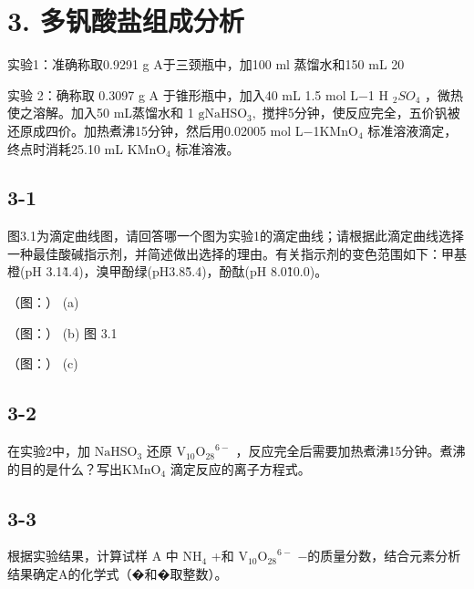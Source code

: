 \section*{3. 多钒酸盐组成分析}
实验1：准确称取0.9291 g A于三颈瓶中，加100 ml 蒸馏⽔和150 mL 20%

实验 2：确称取 0.3097 g A 于锥形瓶中，加⼊40 mL 1.5 mol L−1 H ${ } _ { 2 } S O _ { 4 }$ ，微热使之溶解。加⼊50 mL蒸馏⽔和 1 $\mathrm { g N a H S O _ { 3 } , }$ 搅拌5分钟，使反应完全，五价钒被还原成四价。加热煮沸15分钟，然后⽤0.02005 mol L−1$\mathrm { K M n O } _ { 4 }$ 标准溶液滴定，终点时消耗25.10 mL $\mathrm { K M n O } _ { 4 }$ 标准溶液。

\subsection*{3-1}
图3.1为滴定曲线图，请回答哪⼀个图为实验1的滴定曲线；请根据此滴定曲线选择⼀种最佳酸碱指⽰剂，并简述做出选择的理由。有关指⽰剂的变⾊范围如下：甲基橙(pH 3.1\~4.4)，溴甲酚绿(pH3.8\~5.4)，酚酞(pH 8.0\~10.0)。

（图：）
(a)

（图：）
(b)
图 3.1

（图：）
(c)

\subsection*{3-2}
在实验2中，加 $\mathrm { N a H S O _ { 3 } }$ 还原 $\mathrm { V _ { 1 0 } O _ { 2 8 } } ^ { 6 - }$ ，反应完全后需要加热煮沸15分钟。煮沸的⽬的是什么？写出$\mathrm { K M n O } _ { 4 }$ 滴定反应的离⼦⽅程式。

\subsection*{3-3}
根据实验结果，计算试样 A 中 $\mathrm { N H } _ { 4 }$ +和 $\mathrm { V _ { 1 0 } O _ { 2 8 } } ^ { 6 - }$ −的质量分数，结合元素分析结果确定A的化学式（�和�取整数）。
